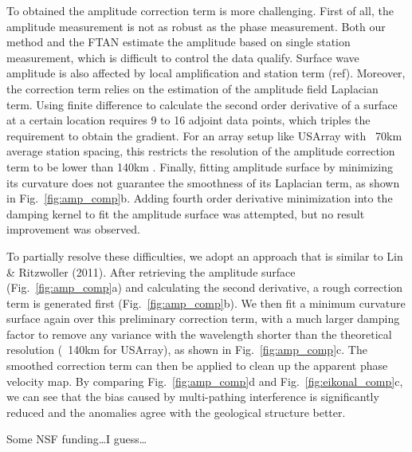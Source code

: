\documentclass{gji}
\begin{document}
To obtained the amplitude correction term is more challenging. First of all, the amplitude measurement is not as robust as the phase measurement. Both our method and the FTAN estimate the amplitude based on single station measurement, which is difficult to control the data qualify. Surface wave amplitude is also affected by local amplification and station term (ref). Moreover, the correction term  relies on the estimation of the amplitude field Laplacian term. Using finite difference to calculate the second order derivative of a surface at a certain location requires 9 to 16 adjoint data points, which triples the requirement to obtain the gradient. For an array setup like USArray with ~70km average station spacing, this restricts the resolution of the amplitude correction term to be lower than 140km \cite{Lin:2011fw}. Finally, fitting amplitude surface by minimizing its curvature does not guarantee the smoothness of its Laplacian term, as shown in Fig.~\ref{fig:amp_comp}b. Adding fourth order derivative minimization into the damping kernel to fit the amplitude surface was attempted, but no result improvement was observed.

To partially resolve these difficulties, we adopt an approach that is similar to Lin \& Ritzwoller (2011). After retrieving the amplitude surface (Fig.~\ref{fig:amp_comp}a) and calculating the second derivative, a rough correction term is generated first (Fig.~\ref{fig:amp_comp}b). We then fit a minimum curvature surface again over this preliminary correction term, with a much larger damping factor to remove any variance with the wavelength shorter than the theoretical resolution (~140km for USArray), as shown in Fig.~\ref{fig:amp_comp}c. The smoothed correction term can then be applied to clean up the apparent phase velocity map. By comparing Fig.~\ref{fig:amp_comp}d and Fig.~\ref{fig:eikonal_comp}c, we can see that the bias caused by multi-pathing interference is significantly reduced and the anomalies agree with the geological structure better. 

\begin{acknowledgments}
	Some NSF funding\ldots I guess\ldots
\end{acknowledgments}
\end{document}
